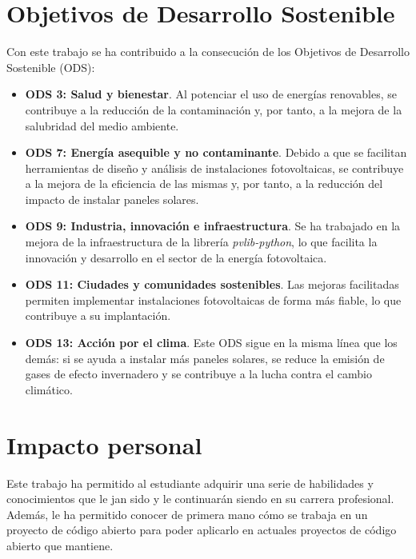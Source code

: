 
\section{Objetivos de Desarrollo Sostenible} \label{sct:impacto:ods}

Con este trabajo se ha contribuido a la consecución de los Objetivos de Desarrollo Sostenible (ODS):

\begin{itemize}
  \item \textbf{ODS 3: Salud y bienestar}. Al potenciar el uso de energías renovables, se contribuye a la reducción de la contaminación y, por tanto, a la mejora de la salubridad del medio ambiente.
  \item \textbf{ODS 7: Energía asequible y no contaminante}. Debido a que se facilitan herramientas de diseño y análisis de instalaciones fotovoltaicas, se contribuye a la mejora de la eficiencia de las mismas y, por tanto, a la reducción del impacto de instalar paneles solares.
  \item \textbf{ODS 9: Industria, innovación e infraestructura}. Se ha trabajado en la mejora de la infraestructura de la librería \textit{pvlib-python}, lo que facilita la innovación y desarrollo en el sector de la energía fotovoltaica.
  \item \textbf{ODS 11: Ciudades y comunidades sostenibles}. Las mejoras facilitadas permiten implementar instalaciones fotovoltaicas de forma más fiable, lo que contribuye a su implantación.
  \item \textbf{ODS 13: Acción por el clima}. Este ODS sigue en la misma línea que los demás: si se ayuda a instalar más paneles solares, se reduce la emisión de gases de efecto invernadero y se contribuye a la lucha contra el cambio climático.
\end{itemize}


\section{Impacto personal} \label{sct:impacto:personal}

Este trabajo ha permitido al estudiante adquirir una serie de habilidades y conocimientos que le jan sido y le continuarán siendo en su carrera profesional. Además, le ha permitido conocer de primera mano cómo se trabaja en un proyecto de código abierto para poder aplicarlo en actuales proyectos de código abierto que mantiene.

